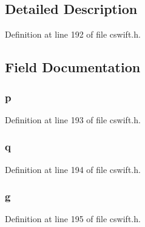 \subsection{Detailed Description}


Definition at line 192 of file cswift.\+h.



\subsection{Field Documentation}
\subsubsection[{\texorpdfstring{p}{p}}]{ p}\hypertarget{struct___s_w___d_s_a_a60e95aa3174f6d5deec9af8e31301f90}{}\label{struct___s_w___d_s_a_a60e95aa3174f6d5deec9af8e31301f90}


Definition at line 193 of file cswift.\+h.

\subsubsection[{\texorpdfstring{q}{q}}]{ q}\hypertarget{struct___s_w___d_s_a_a21ddbe8b788924d70fb99345656604bb}{}\label{struct___s_w___d_s_a_a21ddbe8b788924d70fb99345656604bb}


Definition at line 194 of file cswift.\+h.

\subsubsection[{\texorpdfstring{g}{g}}]{ g}\hypertarget{struct___s_w___d_s_a_aa800be97875810b0c9d036903ee51073}{}\label{struct___s_w___d_s_a_aa800be97875810b0c9d036903ee51073}


Definition at line 195 of file cswift.\+h.

